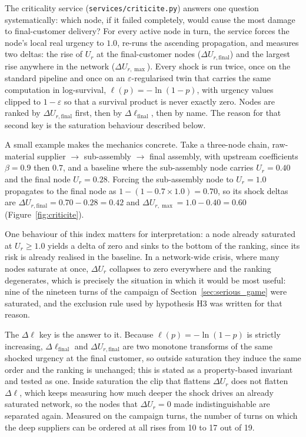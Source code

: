 The criticality service (\texttt{services/criticite.py}) answers one question systematically: which node, if it failed completely, would cause the most damage to final-customer delivery? For every active node in turn, the service forces the node's local real urgency to $1.0$, re-runs the ascending propagation, and measures two deltas: the rise of $U_r$ at the final-customer nodes ($\Delta U_{r,\text{final}}$) and the largest rise anywhere in the network ($\Delta U_{r,\max}$). Every shock is run twice, once on the standard pipeline and once on an $\varepsilon$-regularised twin that carries the same computation in log-survival, $\ell(p) = -\ln(1-p)$, with urgency values clipped to $1-\varepsilon$ so that a survival product is never exactly zero. Nodes are ranked by $\Delta U_{r,\text{final}}$ first, then by $\Delta \ell_{\text{final}}$, then by name. The reason for that second key is the saturation behaviour described below.

A small example makes the mechanics concrete. Take a three-node chain, raw-material supplier $\to$ sub-assembly $\to$ final assembly, with upstream coefficients $\beta = 0.9$ then $0.7$, and a baseline where the sub-assembly node carries $U_{r} = 0.40$ and the final node $U_r = 0.28$. Forcing the sub-assembly node to $U_r = 1.0$ propagates to the final node as $1-(1-0.7\times1.0) = 0.70$, so its shock deltas are $\Delta U_{r,\text{final}} = 0.70-0.28 = 0.42$ and $\Delta U_{r,\max} = 1.0-0.40 = 0.60$ (Figure~\ref{fig:criticite}).

One behaviour of this index matters for interpretation: a node already saturated at $U_r \ge 1.0$ yields a delta of zero and sinks to the bottom of the ranking, since its risk is already realised in the baseline. In a network-wide crisis, where many nodes saturate at once, $\Delta U_r$ collapses to zero everywhere and the ranking degenerates, which is precisely the situation in which it would be most useful: nine of the nineteen turns of the campaign of Section~\ref{sec:serious_game} were saturated, and the exclusion rule used by hypothesis H3 was written for that reason.

The $\Delta \ell$ key is the answer to it. Because $\ell(p) = -\ln(1-p)$ is strictly increasing, $\Delta \ell_{\text{final}}$ and $\Delta U_{r,\text{final}}$ are two monotone transforms of the same shocked urgency at the final customer, so outside saturation they induce the same order and the ranking is unchanged; this is stated as a property-based invariant and tested as one. Inside saturation the clip that flattens $\Delta U_r$ does not flatten $\Delta \ell$, which keeps measuring how much deeper the shock drives an already saturated network, so the nodes that $\Delta U_r = 0$ made indistinguishable are separated again. Measured on the campaign turns, the number of turns on which the deep suppliers can be ordered at all rises from 10 to 17 out of 19.

